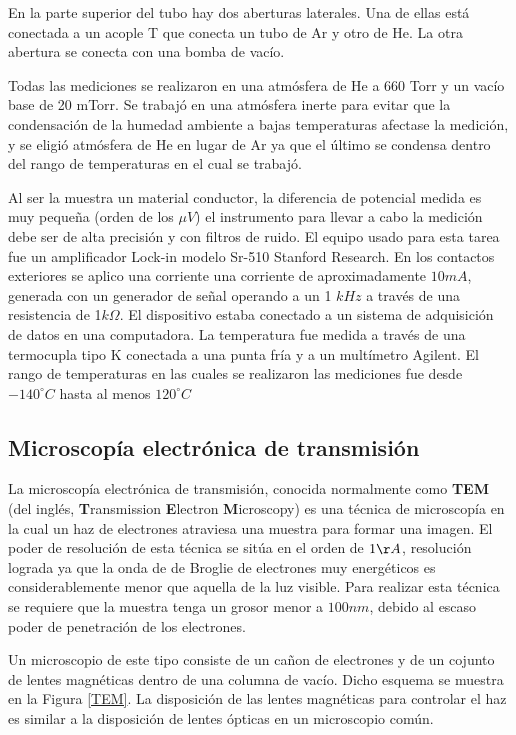 \documentclass[12pt]{article}
\theoremstyle{definition}
\theoremstyle{remark}
\begin{document}
En la parte superior del tubo hay dos aberturas laterales. Una de ellas está conectada a un acople T que conecta un tubo de Ar y otro de He. La otra abertura se conecta con una bomba de vacío.

Todas las mediciones se realizaron en una atmósfera de He a 660 Torr y un vacío base de 20 mTorr. Se trabajó en una atmósfera inerte para evitar que la condensación de la humedad ambiente a bajas temperaturas afectase la medición, y se eligió atmósfera de He en lugar de Ar ya que el último se condensa dentro del rango de temperaturas en el cual se trabajó.

Al ser la muestra un material conductor, la diferencia de potencial medida es muy pequeña (orden de los $\mu V$) el instrumento para llevar a cabo la medición debe ser de alta precisión y con filtros de ruido. El equipo usado para esta tarea fue un amplificador Lock-in modelo Sr-510 Stanford Research. En los contactos exteriores se aplico una corriente una corriente de aproximadamente $10mA$, generada con un generador de señal operando a un 1 $kHz$ a través de una resistencia de 1$k\Omega$. El dispositivo estaba conectado a un sistema de adquisición de datos en una computadora. La temperatura fue medida a través de una termocupla tipo K conectada a una punta fría y a un multímetro Agilent. El rango de temperaturas en las cuales se realizaron las mediciones fue desde $-140 ^\circ C$ hasta al menos $120 ^\circ C$


\subsection{Microscopía electrónica de transmisión}
La microscopía electrónica de transmisión, conocida normalmente como \textbf{TEM} (del inglés, \textbf{T}ransmission \textbf{E}lectron \textbf{M}icroscopy) es una técnica de microscopía en la cual un haz de electrones atraviesa una muestra para formar una imagen. El poder de resolución de esta técnica se sitúa en el orden de $1 \AA$, resolución lograda ya que la onda de de Broglie de electrones muy energéticos es considerablemente menor que aquella de la luz visible. Para realizar esta técnica se requiere que la muestra tenga un grosor menor a $100 nm$, debido al escaso poder de penetración de los electrones.

Un microscopio de este tipo consiste de un cañon de electrones y de un cojunto de lentes magnéticas dentro de una columna de vacío. Dicho esquema se muestra en la Figura \ref{TEM}. La disposición de las lentes magnéticas para controlar el haz es similar a la disposición de lentes ópticas en un microscopio común.
\end{document}
